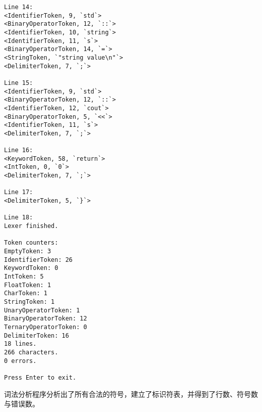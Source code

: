 \documentclass[UTF8]{ctexart}
\begin{document}
\begin{verbatim}
Line 14:
<IdentifierToken, 9, `std`>
<BinaryOperatorToken, 12, `::`>
<IdentifierToken, 10, `string`>
<IdentifierToken, 11, `s`>
<BinaryOperatorToken, 14, `=`>
<StringToken, `"string value\n"`>
<DelimiterToken, 7, `;`>

Line 15:
<IdentifierToken, 9, `std`>
<BinaryOperatorToken, 12, `::`>
<IdentifierToken, 12, `cout`>
<BinaryOperatorToken, 5, `<<`>
<IdentifierToken, 11, `s`>
<DelimiterToken, 7, `;`>

Line 16:
<KeywordToken, 58, `return`>
<IntToken, 0, `0`>
<DelimiterToken, 7, `;`>

Line 17:
<DelimiterToken, 5, `}`>

Line 18:
Lexer finished.

Token counters:
EmptyToken: 3
IdentifierToken: 26
KeywordToken: 0
IntToken: 5
FloatToken: 1
CharToken: 1
StringToken: 1
UnaryOperatorToken: 1
BinaryOperatorToken: 12
TernaryOperatorToken: 0
DelimiterToken: 16
18 lines.
266 characters.
0 errors.

Press Enter to exit.
\end{verbatim}
词法分析程序分析出了所有合法的符号，建立了标识符表，并得到了行数、符号数与错误数。
\end{document}
